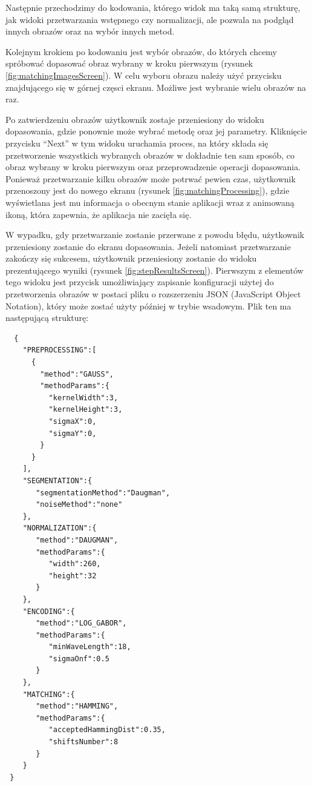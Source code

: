 Następnie przechodzimy do kodowania, którego widok ma taką samą strukturę, jak widoki przetwarzania
wstępnego czy normalizacji, ale pozwala na podgląd innych obrazów oraz na wybór innych metod.\newline

Kolejnym krokiem po kodowaniu jest wybór obrazów, do których chcemy spróbowa\'c dopasowa\'c obraz
wybrany w kroku pierwszym (rysunek \ref{fig:matchingImagesScreen}). W celu wyboru obrazu należy
uży\'c przycisku znajdującego się w górnej częsci ekranu. Możliwe jest wybranie wielu obrazów na raz.\newline

Po zatwierdzeniu obrazów użytkownik zostaje przeniesiony do widoku dopasowania, gdzie ponownie
może wybra\'c metodę oraz jej parametry. Kliknięcie przycisku ``Next'' w tym widoku
uruchamia proces, na który składa się przetworzenie wszystkich wybranych obrazów w dokładnie
ten sam sposób, co obraz wybrany w kroku pierwszym oraz przeprowadzenie operacji dopasowania.
Ponieważ przetwarzanie kilku obrazów może potrwa\'c pewien czas, użytkownik przenoszony jest do
nowego ekranu (rysunek \ref{fig:matchingProcessing}), gdzie wyświetlana jest mu informacja o obecnym
stanie aplikacji wraz z animowaną ikoną, która zapewnia, że aplikacja nie zacięła się.

W wypadku, gdy przetwarzanie zostanie przerwane z powodu błędu, użytkownik przeniesiony zostanie do ekranu
dopasowania. Jeżeli natomiast przetwarzanie zakończy się sukcesem, użytkownik przeniesiony zostanie
do widoku prezentującego wyniki (rysunek \ref{fig:stepResultsScreen}). Pierwszym z elementów tego widoku
jest przycisk umożliwiający zapisanie konfiguracji użytej do przetworzenia obrazów w postaci pliku
o rozszerzeniu JSON (JavaScript Object Notation), który może zosta\'c użyty pó\'zniej w trybie
wsadowym. Plik ten ma następującą strukturę:

\begin{verbatim}
  {
    "PREPROCESSING":[
      {
        "method":"GAUSS",
        "methodParams":{
          "kernelWidth":3,
          "kernelHeight":3,
          "sigmaX":0,
          "sigmaY":0,
        }
      }
    ],
    "SEGMENTATION":{
       "segmentationMethod":"Daugman",
       "noiseMethod":"none"
    },
    "NORMALIZATION":{
       "method":"DAUGMAN",
       "methodParams":{
          "width":260,
          "height":32
       }
    },
    "ENCODING":{
       "method":"LOG_GABOR",
       "methodParams":{
          "minWaveLength":18,
          "sigmaOnf":0.5
       }
    },
    "MATCHING":{
       "method":"HAMMING",
       "methodParams":{
          "acceptedHammingDist":0.35,
          "shiftsNumber":8
       }
    }
 }
\end{verbatim}

